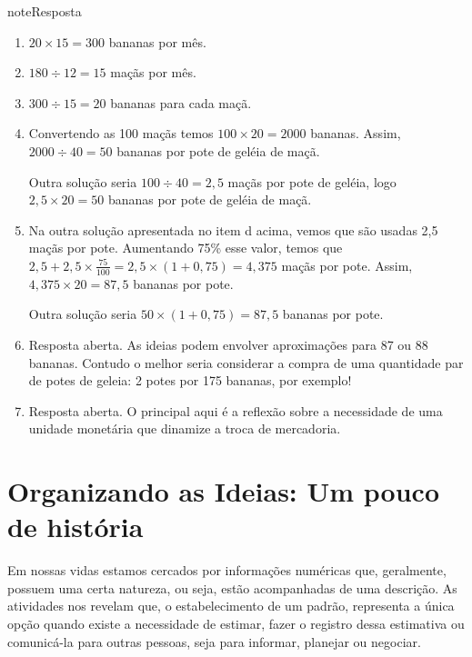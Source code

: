 \begin{sphinxadmonition}{note}{Resposta}
\begin{enumerate}
\item {} 
\(20 \times 15 = 300\) bananas por mês.

\item {} 
\(180 \div 12 = 15\) maçãs por mês.

\item {} 
\(300 \div 15 = 20\) bananas para cada maçã.

\item {} 
Convertendo as 100 maçãs temos \(100 \times 20 = 2000\) bananas. Assim, \(2000 \div 40 = 50\) bananas por pote de geléia de maçã.

Outra solução seria \(100 \div 40 = 2,5\) maçãs por pote de geléia, logo \(2,5 \times 20 = 50\) bananas por pote de geléia de maçã.

\item {} 
Na outra solução apresentada no item d acima, vemos que são usadas 2,5 maçãs por pote. Aumentando 75\% esse valor, temos que \(2,5 + 2,5 \times \frac{75}{100} = 2,5 \times (1+0,75) = 4,375\) maçãs por pote. Assim, \(4,375\times 20 = 87,5\) bananas por pote.

Outra solução seria \(50 \times (1+0,75) = 87,5\) bananas por pote.

\item {} 
Resposta aberta. As ideias podem envolver aproximações para 87 ou 88 bananas. Contudo o melhor seria considerar a compra de uma quantidade par de potes de geleia: 2 potes por 175 bananas, por exemplo!

\item {} 
Resposta aberta. O principal aqui é a reflexão sobre a necessidade de uma unidade monetária que dinamize a troca de mercadoria.

\end{enumerate}
\end{sphinxadmonition}


\section{Organizando as Ideias: Um pouco de história}
\label{\detokenize{NO103-0:organizando-as-ideias-um-pouco-de-historia}}
Em nossas vidas estamos cercados por informações numéricas que, geralmente, possuem uma certa natureza, ou seja, estão acompanhadas de uma descrição. As atividades nos revelam que, o estabelecimento de um padrão, representa a única opção quando existe a necessidade de estimar, fazer o registro dessa estimativa ou comunicá-la para outras pessoas, seja para informar, planejar ou negociar.

